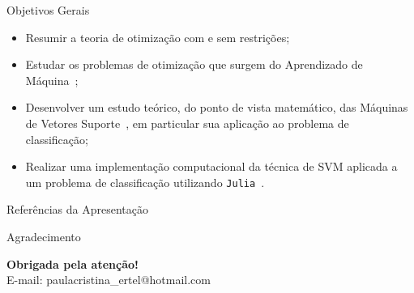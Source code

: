 \documentclass{beamer}
\theoremstyle{definition}%
\begin{document}
\begin{frame}{Objetivos Gerais}
\begin{block}{}
\begin{itemize}
	\item Resumir a teoria de otimização com e sem restrições;

	\item Estudar os problemas de otimização que surgem do Aprendizado de Máquina~\cite{Ana1994,Ademir2013};

	\item Desenvolver um estudo teórico, do ponto de vista matemático, das Máquinas de Vetores Suporte~\cite{Faisal2019,Evelin2017}, em particular sua aplicação ao problema de classificação;



	\item Realizar uma implementação computacional da técnica de SVM aplicada a um problema de classificação utilizando \texttt{Julia}~\cite{Bezanson:2017g}.
\end{itemize}
\end{block}
\end{frame}


%





\begin{frame}{Referências da Apresentação}
\printbibliography
\end{frame}

\begin{frame}{Agradecimento}

\begin{block}{}

\centering
\Large{\textbf{Obrigada pela atenção!}}
$$$$
{\normalsize E-mail: paulacristina\_ertel@hotmail.com }

\end{block}
\end{frame}
\end{document}
